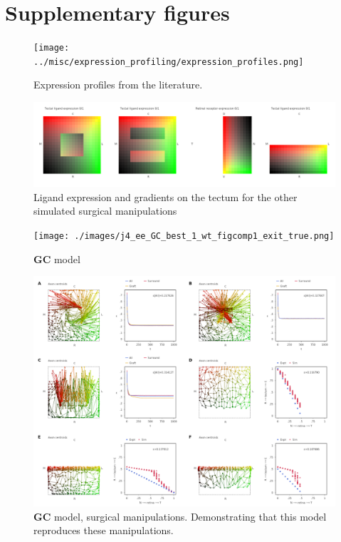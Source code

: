 \documentclass[11pt, a4paper, draft]{article}
\begin{document}
\section*{Supplementary figures}

\begin{figure}
\texttt{[image: ../misc/expression\_profiling/expression\_profiles.png]}
\caption{Expression profiles from the literature.}
\label{f:expressions}
\end{figure}

\begin{figure}
\includegraphics[width=\linewidth]{./images/expressions_manipulations.png}
\caption{Ligand expression and gradients on the tectum for the
other simulated surgical manipulations}
\label{f:tmanip}
\end{figure}

\begin{figure}
\texttt{[image: ./images/j4\_ee\_GC\_best\_1\_wt\_figcomp1\_exit\_true.png]}
\caption{$\mathbf{GC}$ model}
\label{f:GC}
\end{figure}

\begin{figure}
\includegraphics[width=\linewidth]{./images/fig_GC_surgical.png}
\caption{$\mathbf{GC}$ model, surgical manipulations. Demonstrating that this
model reproduces these manipulations.}
\label{f:GCsurg}
\end{figure}
\end{document}
